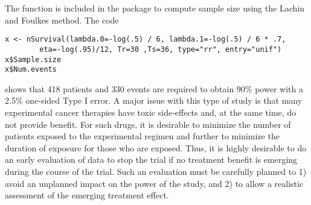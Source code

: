 The function  is included in the package to compute sample size using the Lachin and Foulkes \cite{LachinFoulkes} method. 
The code 
\begin{verbatim}
x <- nSurvival(lambda.0=-log(.5) / 6, lambda.1=-log(.5) / 6 * .7, 
        eta=-log(.95)/12, Tr=30 ,Ts=36, type="rr", entry="unif")
x$Sample.size
x$Num.events
\end{verbatim}
shows that 418 patients and 330 events are required to obtain 90\% power with a 2.5\% one-sided Type I error.
A major issue with this type of study is that many experimental cancer therapies have toxic side-effects  and, at the same time, do not provide benefit. 
For such drugs, it is desirable to minimize the number of patients exposed to the experimental regimen and further to minimize the duration of exposure for those who are exposed. 
Thus, it is highly desirable to do an early evaluation of data to stop the trial if no treatment benefit is emerging during the course of the trial. 
Such an evaluation must be carefully planned to 1) avoid an unplanned impact on the power of the study, and 2) to allow a realistic assessment of the emerging treatment effect.
